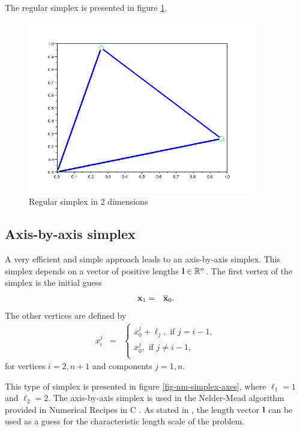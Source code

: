 The regular simplex is presented in figure \ref{fig-nm-simplex-regular}.

\begin{figure}
\begin{center}
\includegraphics[width=10cm]{simplex_regular.png}
\end{center}
\caption{Regular simplex in 2 dimensions}
\label{fig-nm-simplex-regular}
\end{figure}

\subsection{Axis-by-axis simplex}

A very efficient and simple approach leads to an axis-by-axis simplex.
This simplex depends on a vector of positive lengths $\mathbf{l}\in\mathbb{R}^n$.
The first vertex of the simplex is the initial guess 
\begin{eqnarray}
\mathbf{x}_1 &=& \overline{\mathbf{x}}_0.
\end{eqnarray}
The other vertices are defined by 
\begin{eqnarray}
x_i^j &=& 
\left\{
\begin{array}{l}
\overline{x}_0^j + \ell_j, \textrm{ if } j=i-1,\\
\overline{x}_0^j, \textrm{ if } j\neq i-1,\\
\end{array}
\right.
\end{eqnarray}
for vertices $i=2,n+1$ and components $j=1,n$.

This type of simplex is presented in figure \ref{fig-nm-simplex-axes},
where $\ell_1=1$ and $\ell_2=2$.
The axis-by-axis simplex is used in the Nelder-Mead 
algorithm provided in Numerical Recipes in C \cite{NumericalRecipes}.
As stated in \cite{NumericalRecipes}, the length vector $\mathbf{l}$ can 
be used as a guess for the characteristic length scale of the problem.

